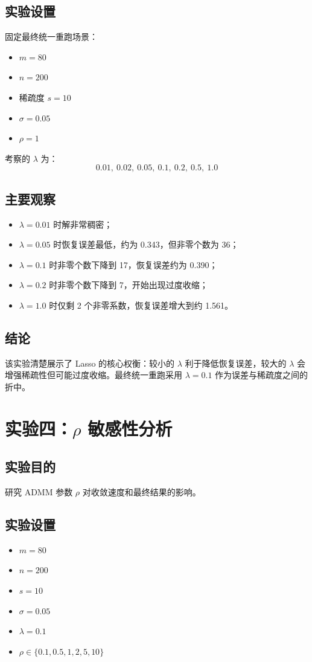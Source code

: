 \documentclass[12pt,a4paper]{ctexart}
\begin{document}
\subsection{实验设置}
固定最终统一重跑场景：
\begin{itemize}[leftmargin=2em]
    \item $m=80$
    \item $n=200$
    \item 稀疏度 $s=10$
    \item $\sigma=0.05$
    \item $\rho=1$
\end{itemize}
考察的 $\lambda$ 为：
\[
0.01,\ 0.02,\ 0.05,\ 0.1,\ 0.2,\ 0.5,\ 1.0
\]

\subsection{主要观察}
\begin{itemize}[leftmargin=2em]
    \item $\lambda=0.01$ 时解非常稠密；
    \item $\lambda=0.05$ 时恢复误差最低，约为 0.343，但非零个数为 36；
    \item $\lambda=0.1$ 时非零个数下降到 17，恢复误差约为 0.390；
    \item $\lambda=0.2$ 时非零个数下降到 7，开始出现过度收缩；
    \item $\lambda=1.0$ 时仅剩 2 个非零系数，恢复误差增大到约 1.561。
\end{itemize}

\subsection{结论}
该实验清楚展示了 Lasso 的核心权衡：较小的 $\lambda$ 利于降低恢复误差，较大的 $\lambda$ 会增强稀疏性但可能过度收缩。最终统一重跑采用 $\lambda=0.1$ 作为误差与稀疏度之间的折中。

\section{实验四：$\rho$ 敏感性分析}
\subsection{实验目的}
研究 ADMM 参数 $\rho$ 对收敛速度和最终结果的影响。

\subsection{实验设置}
\begin{itemize}[leftmargin=2em]
    \item $m=80$
    \item $n=200$
    \item $s=10$
    \item $\sigma=0.05$
    \item $\lambda=0.1$
    \item $\rho \in \{0.1, 0.5, 1, 2, 5, 10\}$
\end{itemize}
\end{document}
